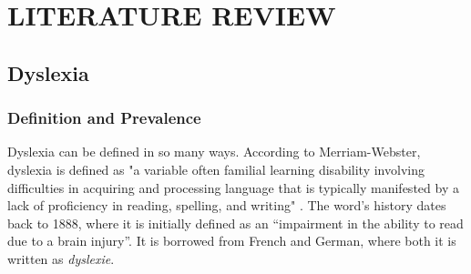 \chapter{LITERATURE REVIEW}
\label{ch:litreview}














\section{Dyslexia}

\subsection{Definition and Prevalence}

Dyslexia can be defined in so many ways. According to Merriam-Webster, dyslexia is defined as "a variable often familial learning disability involving difficulties in acquiring and processing language that is typically manifested by a lack of proficiency in reading, spelling, and writing" \parencite{mw:dyslexia}. The word's history dates back to 1888, where it is initially defined as an ``impairment in the ability to read due to a brain injury''. It is borrowed from French and German, where both it is written as \emph{dyslexie}. 

